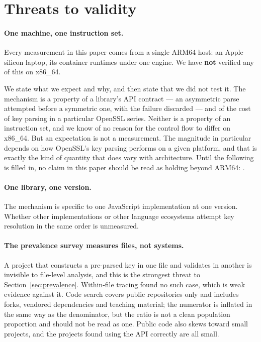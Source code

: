 \documentclass[pdflatex,sn-basic,twocolumn]{sn-jnl}
\begin{document}
\section{Threats to validity}\label{sec:threats}

\paragraph{One machine, one instruction set.} Every measurement in this paper
comes from a single ARM64 host: an Apple silicon laptop, its container runtimes
under one engine. We have \textbf{not} verified any of this on x86\_64.

We state what we expect and why, and then state that we did not test it. The
mechanism is a property of a library's API contract --- an asymmetric parse
attempted before a symmetric one, with the failure discarded --- and of the cost
of key parsing in a particular OpenSSL series. Neither is a property of an
instruction set, and we know of no reason for the control flow to differ on
x86\_64. But an expectation is not a measurement. The magnitude in particular
depends on how OpenSSL's key parsing performs on a given platform, and that is
exactly the kind of quantity that does vary with architecture. Until the
following is filled in, no claim in this paper should be read as holding beyond
ARM64: \xEightSixReplication.

\paragraph{One library, one version.} The mechanism is specific to one JavaScript
implementation at one version. Whether other implementations or other language
ecosystems attempt key resolution in the same order is unmeasured.

\paragraph{The prevalence survey measures files, not systems.} A project that
constructs a pre-parsed key in one file and validates in another is invisible to
file-level analysis, and this is the strongest threat to
Section~\ref{sec:prevalence}. Within-file tracing found no such case, which is
weak evidence against it. Code search covers public repositories only and
includes forks, vendored dependencies and teaching material; the numerator is
inflated in the same way as the denominator, but the ratio is not a clean
population proportion and should not be read as one. Public code also skews
toward small projects, and the \AdjudicatedGenuineProjects{} projects found using
the API correctly are all small.
\end{document}
